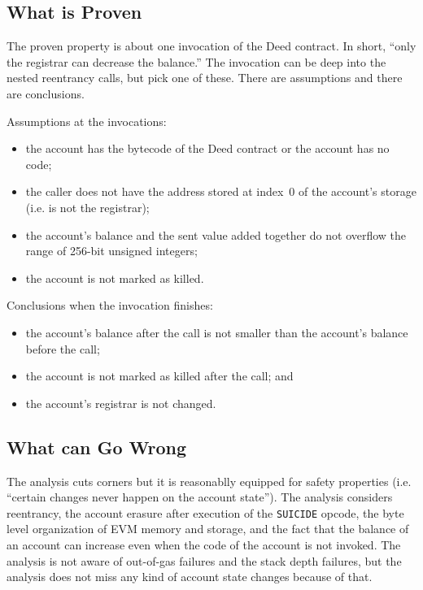 \documentclass[11pt,a4paper]{article}
\begin{document}
\subsection{What is Proven}

The proven property is about one invocation of the Deed contract.
In short, ``only the registrar can decrease the balance.''
The invocation can be deep into the nested reentrancy calls, but pick
one of these.
There are assumptions and there are conclusions.

Assumptions at the invocations:
\begin{itemize}
  \item the account has the bytecode of the Deed contract or the
    account has no code;
  \item the caller does not have the address stored at index~0 of the
    account's storage (i.e. is not the registrar);
  \item the account's balance and the sent value added together do not
    overflow the range of 256-bit unsigned integers;
  \item the account is not marked as killed.
\end{itemize}

Conclusions when the invocation finishes:
\begin{itemize}
  \item the account's balance after the call is not smaller than the
    account's balance before the call;
  \item the account is not marked as killed after the call; and
  \item the account's registrar is not changed.
\end{itemize}


\subsection{What can Go Wrong}

The analysis cuts corners but it is reasonablly equipped for safety
properties (i.e. ``certain changes never happen on the account
state'').  The analysis considers reentrancy, the account erasure after execution
of the \texttt{SUICIDE} opcode, the byte level organization of EVM
memory and storage, and the fact that the balance of an account can
increase even when the code of the account is not invoked.
The analysis is not aware of out-of-gas failures and the stack depth
failures, but the analysis does not miss any kind of account state
changes because of that.
\end{document}
